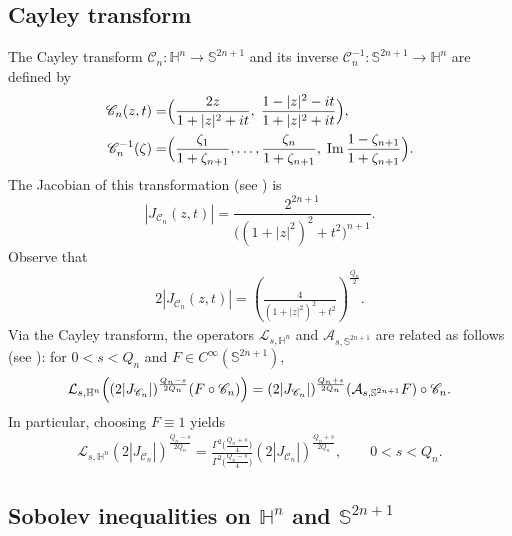 \documentclass[12pt,reqno]{amsart}%
\theoremstyle{plain}
\numberwithin{equation}{section}
\begin{document}
\subsection{Cayley transform}
The Cayley transform \(\mathscr{C}_{n} : \mathbb{H}^n \to \mathbb{S}^{2n+1}\) and its inverse \(\mathscr{C}_{n}^{-1} : \mathbb{S}^{2n+1} \to \mathbb{H}^n\) are defined by
\begin{align}
\label{2.1}
\mathscr{C}_{n}(z, t) =& \Bigl( \frac{2z}{1 + |z|^2 + it},\; \frac{1 - |z|^2 - it}{1 + |z|^2 + it} \Bigr),\\
\label{2.2}
\mathscr{C}_{n}^{-1}(\zeta) =& \Bigl( \frac{\zeta_1}{1 + \zeta_{n+1}},\dots, \frac{\zeta_n}{1 + \zeta_{n+1}},\;
\operatorname{Im}\frac{1 - \zeta_{n+1}}{1 + \zeta_{n+1}} \Bigr).
\end{align}
The Jacobian of this transformation (see \cite{br1}) is
\[
|J_{\mathscr{C}_{n}}(z, t)| = \frac{2^{2n+1}}{\bigl( (1 + |z|^2)^2 + t^2 \bigr)^{n+1}}.
\]
Observe that
\begin{align}\label{2.3}
2|J_{\mathscr{C}_{n}}(z, t)| = \left(\frac{4}{(1 + |z|^2)^2 + t^2 }\right)^{\frac{Q_n}{2}}.
\end{align}
Via the Cayley transform, the operators \(\mathcal{L}_{s,\mathbb{H}^{n}}\) and \(\mathcal{A}_{s,\mathbb{S}^{2n+1}}\) are related as follows (see \cite{br1}): for \(0 < s < Q_n\) and \(F \in C^{\infty}(\mathbb{S}^{2n+1})\),
\begin{align}\label{2.6}
\mathcal{L}_{s,\mathbb{H}^{n}}\Bigl( (2|J_{\mathscr{C}_{n}}|)^{\frac{Q_n-s}{2Q_n}} (F \circ \mathscr{C}_{n}) \Bigr)
= (2|J_{\mathscr{C}_{n}}|)^{\frac{Q_n+s}{2Q_n}} (\mathcal{A}_{s,\mathbb{S}^{2n+1}} F) \circ \mathscr{C}_{n}.
\end{align}
In particular, choosing \(F \equiv 1\) yields
\begin{align}\label{2.7}
\mathcal{L}_{s,\mathbb{H}^{n}} (2|J_{\mathscr{C}_{n}}|)^{\frac{Q_n-s}{2Q_n}}
= \frac{\Gamma^{2}\bigl(\frac{Q_n + s}{4}\bigr)}{\Gamma^{2}\bigl(\frac{Q_n-s}{4}\bigr)}
(2|J_{\mathscr{C}_{n}}|)^{\frac{Q_n+s}{2Q_n}}, \qquad 0 < s < Q_n.
\end{align}


\subsection{Sobolev inequalities on \(\mathbb{H}^{n}\) and \(\mathbb{S}^{2n+1}\)}
\end{document}
